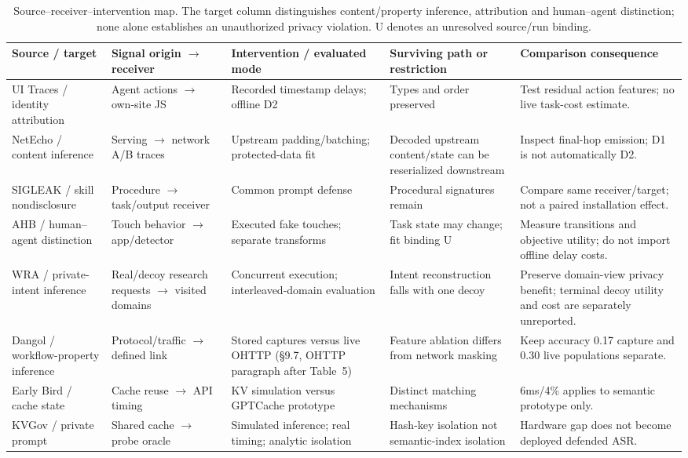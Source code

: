 \begin{table}[t]\centering\footnotesize
\caption{Source--receiver--intervention map. The target column distinguishes content/property inference, attribution and human--agent distinction; none alone establishes an unauthorized privacy violation. U denotes an unresolved source/run binding.}\label{tab:receiver-intervention-matrix}
\begin{tabularx}{\textwidth}{@{}p{}p{}p{}YY@{}}\toprule
Source / target & Signal origin $\to$ receiver & Intervention / evaluated mode & Surviving path or restriction & Comparison consequence\\\midrule
UI Traces / identity attribution & Agent actions $\to$ own-site JS & Recorded timestamp delays; offline D2 & Types and order preserved & Test residual action features; no live task-cost estimate.\\
NetEcho / content inference & Serving $\to$ network A/B traces & Upstream padding/batching; protected-data fit & Decoded upstream content/state can be reserialized downstream & Inspect final-hop emission; D1 is not automatically D2.\\
SIGLEAK / skill nondisclosure & Procedure $\to$ task/output receiver & Common prompt defense & Procedural signatures remain & Compare same receiver/target; not a paired installation effect.\\
AHB / human--agent distinction & Touch behavior $\to$ app/detector & Executed fake touches; separate transforms & Task state may change; fit binding U & Measure transitions and objective utility; do not import offline delay costs.\\
WRA / private-intent inference & Real/decoy research requests $\to$ visited domains & Concurrent execution; interleaved-domain evaluation & Intent reconstruction falls with one decoy & Preserve domain-view privacy benefit; terminal decoy utility and cost are separately unreported.\\
Dangol / workflow-property inference & Protocol/traffic $\to$ defined link & Stored captures versus live OHTTP (\S9.7, OHTTP paragraph after Table~5) & Feature ablation differs from network masking & Keep accuracy 0.17 capture and 0.30 live populations separate.\\
Early Bird / cache state & Cache reuse $\to$ API timing & KV simulation versus GPTCache prototype & Distinct matching mechanisms & 6ms/4\% applies to semantic prototype only.\\
KVGov / private prompt & Shared cache $\to$ probe oracle & Simulated inference; real timing; analytic isolation & Hash-key isolation not semantic-index isolation & Hardware gap does not become deployed defended ASR.\\

\end{tabularx}
\end{table}
